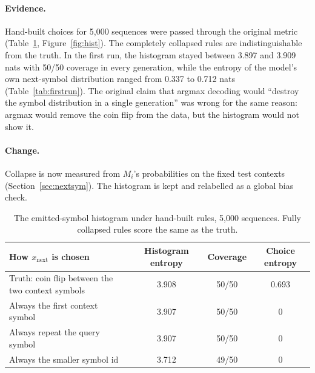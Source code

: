 \documentclass[11pt,a4paper]{article}
\newcommand{\xnext}{x_{\mathrm{next}}}
\begin{document}
\paragraph{Evidence.} Hand-built choices for 5{,}000 sequences were passed
through the original metric (Table~\ref{tab:blind}, Figure~\ref{fig:hist}).
The completely collapsed rules are indistinguishable from the truth. In the
first run, the histogram stayed between 3.897 and 3.909 nats with 50/50
coverage in every generation, while the entropy of the model's own
next-symbol distribution ranged from 0.337 to 0.712 nats
(Table~\ref{tab:firstrun}). The original claim that argmax decoding would
``destroy the symbol distribution in a single generation'' was wrong for the
same reason: argmax would remove the coin flip from the data, but the
histogram would not show it.
\paragraph{Change.} Collapse is now measured from $M_i$'s probabilities on the
fixed test contexts (Section~\ref{sec:nextsym}). The histogram is kept and
relabelled as a global bias check.

\begin{table}[htbp]
\centering
\small
\caption{The emitted-symbol histogram under hand-built rules, 5{,}000
sequences. Fully collapsed rules score the same as the truth.}
\label{tab:blind}
\begin{tabular}{lccc}
\toprule
How $\xnext$ is chosen & Histogram entropy & Coverage & Choice entropy\\
\midrule
Truth: coin flip between the two context symbols & 3.908 & 50/50 & 0.693\\
Always the first context symbol & 3.907 & 50/50 & 0\\
Always repeat the query symbol & 3.907 & 50/50 & 0\\
Always the smaller symbol id & 3.712 & 49/50 & 0\\
\bottomrule
\end{tabular}
\end{table}
\end{document}
